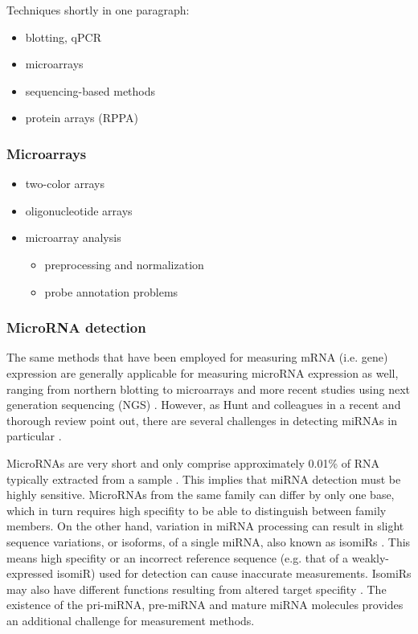 Techniques shortly in one paragraph:
\begin{itemize}
  \item blotting, qPCR
  \item microarrays
  \item sequencing-based methods
  \item protein arrays (RPPA)
\end{itemize}





\subsubsection{Microarrays}

\begin{itemize}
  \item two-color arrays
  \item oligonucleotide arrays
  \item microarray analysis
  \begin{itemize}
    \item preprocessing and normalization
    \item probe annotation problems
  \end{itemize}
\end{itemize}



\subsubsection{MicroRNA detection}

The same methods that have been employed for measuring mRNA (i.e. gene)
expression are generally applicable for measuring microRNA expression as well,
ranging from northern blotting to microarrays and more recent studies using next
generation sequencing (NGS) \citep{Huang2011}. However, as Hunt and colleagues
in a recent and thorough review point out, there are several challenges in
detecting miRNAs in particular \citep{Hunt2015}.

MicroRNAs are very short and only comprise approximately 0.01\% of RNA
typically extracted from a sample \citep{Dong2013}. This implies that miRNA
detection must be highly sensitive. MicroRNAs from the same family can differ
by only one base, which in turn requires high specifity to be able to
distinguish between family members. On the other hand, variation in miRNA
processing can result in slight sequence variations, or isoforms, of a single
miRNA, also known as isomiRs \citep{StaregaRoslan2011,Lee2010}. This means
high specifity or an incorrect reference sequence (e.g. that of a 
weakly-expressed isomiR) used for detection can cause inaccurate measurements.
IsomiRs may also have different functions resulting from altered target
specifity \citep{Chugh2012}. The existence of the pri-miRNA, pre-miRNA and
mature miRNA molecules provides an additional challenge for measurement
methods.

